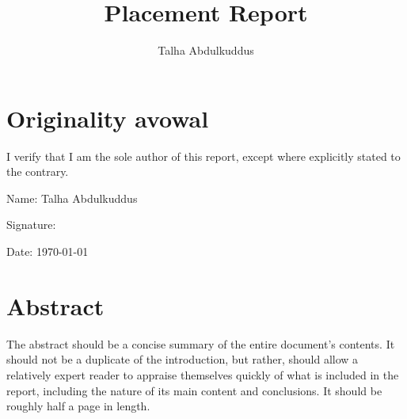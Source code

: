 \documentclass[british,12pt,a4paper]{report}
\begin{document}
\title{Placement Report}
\author{Talha Abdulkuddus}


\setcounter{page}{2} %

\vfill

\section*{Originality avowal}

I verify that I am the sole author of this report, except where explicitly
stated to the contrary.

\bigskip

Name: Talha Abdulkuddus

\medskip

Signature:


\medskip

Date: \today

\vfill

\section*{Abstract}

The abstract should be a concise summary of the entire document's contents.
It should not be a duplicate of the introduction, but rather,
should allow a relatively expert reader to appraise themselves quickly
of what is included in the report,
including the nature of its main content and conclusions.
It should be roughly half a page in length.

\vfill

\tableofcontents
\listoffigures





\printglossary[type=\acronymtype]
\printglossary[type=main]
\printbibliography
\end{document}

